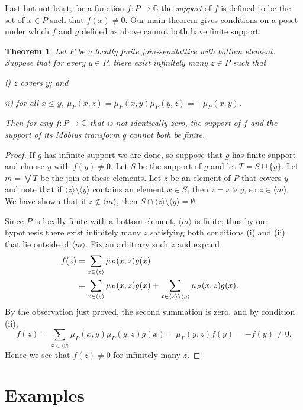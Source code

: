 \documentclass[11pt]{amsart}
\newtheorem{theorem}{Theorem}[section]
\theoremstyle{myexample}
\theoremstyle{myremark}
\theoremstyle{conjecture}
\numberwithin{equation}{section}
\def\ideal#1{\langle #1\rangle}
\def\CC{\mathbb{C}}
\begin{document}
Last but not least, for a function $f:P\to \CC$ the {\it support} of $f$ is defined to be the set
of $x\in P$ such that $f(x)\ne 0$.
Our main theorem gives conditions on a poset under
which $f$ and $g$ defined as above cannot both have finite support.

\begin{theorem}\label{main}
Let $P$ be a locally finite
join-semilattice with bottom element. Suppose that for every $y\in P$,
there exist infinitely
many $z\in P$ such that
\medskip
\item{i)} $z$ covers $y$; and
\smallskip
\item{ii)} for all $x\le y$, $\mu_P(x,z) = \mu_P(x,y)\mu_P(y,z) = -\mu_P(x,y)$.

\medskip
\noindent Then for any $f:P\to \CC$ that is not identically zero,
the support of $f$ and the support of its M\"obius transform $g$ cannot both be finite.
\end{theorem}

\begin{proof}
If $g$ has infinite support we are done, so suppose that $g$ has finite support
and choose $y$ with $f(y)\ne 0$. Let $S$ be the support of $g$ and let $T = S\cup\{y\}$. Let $m = \bigvee T$
be the join of these elements. Let $z$ be an element of $P$ that covers $y$ and note that if
$\ideal z\setminus \ideal y$ contains an element $x\in S$, then $z = x\vee y$, so $z\in \ideal m$.
We have shown that if $z\notin \ideal m$, then $S\cap \ideal z \setminus \ideal y = \emptyset$.

Since $P$ is locally finite with a bottom element, $\ideal m$ is finite; thus
by our hypothesis there exist infinitely many $z$ satisfying both conditions (i) and (ii)
that lie outside of $\ideal m$. Fix an arbitrary such $z$ and expand
\begin{align*}
f(z) &= \sum_{x \in \ideal z} \mu_P(x,z) g(x) \cr
&= \sum_{x\in \ideal y}\mu_P(x,z)g(x)
+ \sum_{x\in \ideal z \setminus \ideal y} \mu_P(x,z) g(x).\cr
\end{align*}
By the observation just proved, the second summation is zero, and by condition (ii),
$$f(z) = \sum_{x\in \ideal y} \mu_P(x,y)\mu_P(y,z) g(x) = \mu_P(y,z) f(y) = -f(y) \ne 0.$$
Hence we see that $f(z) \ne 0$ for infinitely many $z$.
\end{proof}


\section{Examples}
\end{document}
